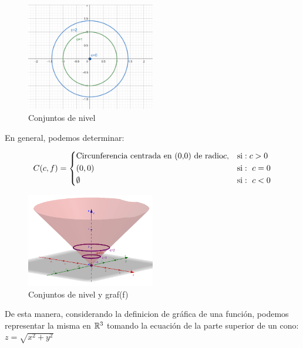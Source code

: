 \begin{definition} 
\begin{figure}[h!] %
    \centering
    \includegraphics[width=0.5\textwidth]{../figs/conjunto2_r2.png} %
    \caption{Conjuntos de nivel}
    \label{fig:ejemplo} %
\end{figure}

En general, podemos determinar: 

   \[
        C(c,f)=
        \begin{dcases}
           \textnormal{Circunferencia centrada en (0,0) de radio} c,  & \textnormal{si}:  c>0 \\
(0,0)  & \textnormal{si}:\ c=0\\
\emptyset  & \textnormal{si}:\ c<0\\
        \end{dcases}
    \]
\begin{figure}[h!] %
    \centering
    \includegraphics[width=0.5\textwidth]{../figs/conjunto2_r3.png} %
    \caption{Conjuntos de nivel y graf(f)}
    \label{fig:ejemplo} %
\end{figure}

De esta manera, considerando la definicion de gráfica de una funci\'on, podemos representar la misma en $\mathbb{R}^3$ tomando  la ecuaci\'on de la parte superior de un cono: $z=\sqrt{x^2+y^2}$




\end{definition}

